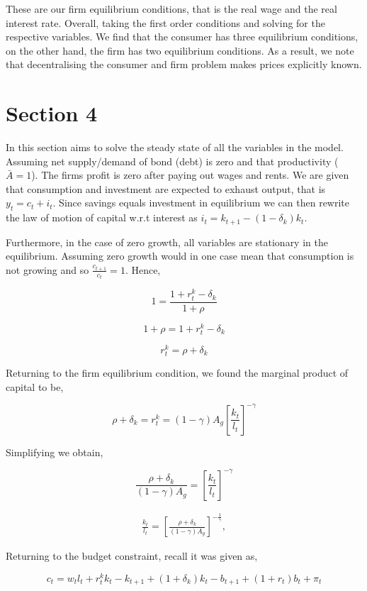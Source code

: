\documentclass[
  11pt,
  justified]{article}
\begin{document}
These are our firm equilibrium conditions, that is the real wage and the
real interest rate. Overall, taking the first order conditions and
solving for the respective variables. We find that the consumer has
three equilibrium conditions, on the other hand, the firm has two
equilibrium conditions. As a result, we note that decentralising the
consumer and firm problem makes prices explicitly known.

\hypertarget{section-4}{%
\section{Section 4}\label{section-4}}

In this section aims to solve the steady state of all the variables in
the model. Assuming net supply/demand of bond (debt) is zero and that
productivity (\(\bar A = 1\)). The firms profit is zero after paying out
wages and rents. We are given that consumption and investment are
expected to exhaust output, that is \(y_t = c_t + i_t\). Since savings
equals investment in equilibrium we can then rewrite the law of motion
of capital w.r.t interest as \(i_t = k_{t+1} - (1-\delta_k)k_t\).

Furthermore, in the case of zero growth, all variables are stationary in
the equilibrium. Assuming zero growth would in one case mean that
consumption is not growing and so \(\frac{c_{t+1}}{c_t} = 1\). Hence,

\[
1 = \frac{1 + r_{t}^k - \delta_k}{1+\rho}
\]

\[
1+\rho = 1 + r_{t}^k - \delta_k
\]

\[
r_{t}^k = \rho + \delta_k
\]

Returning to the firm equilibrium condition, we found the marginal
product of capital to be,

\[
\rho + \delta_k = r_{t}^k = (1-\gamma) A_g [\frac{k_t}{l_t}]^{- \gamma}
\]

Simplifying we obtain,

\[
\frac{\rho + \delta_k}{(1-\gamma) A_g} = [\frac{k_t}{l_t}]^{ - \gamma}
\]

\begin{align}
\frac{k_t}{l_t} = [\frac{\rho + \delta_k}{(1-\gamma) A_g}]^{-\frac{1}{\gamma}},  \tag{capital to labour ratio} \label{eq:kl}
\end{align}

Returning to the budget constraint, recall it was given as,

\[
c_t = w_tl_t + r_t^k k_t - k_{t+1} + (1+\delta_k)k_t - b_{t+1}  + (1+r_t)b_t + \pi_t
\]
\end{document}
